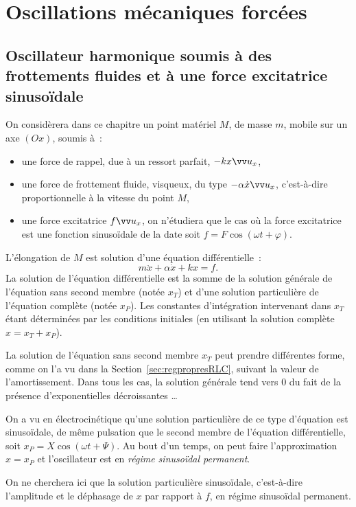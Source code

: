 \chapter{Oscillations mécaniques forcées}%
\minitoc{}
\minilof{}
\minilot{}

\section{Oscillateur harmonique soumis à des frottements fluides et à une force
excitatrice sinusoïdale}
On considèrera dans ce chapitre un point matériel \(M\), de masse \(m\), mobile
sur un axe \((Ox)\), soumis à~:
\begin{itemize}%
  \item une force de rappel, due à un ressort parfait, \(-kx \ux\),
  \item une force de frottement fluide, visqueux, du type \(-\alpha \dot{x}
    \ux\), c'est-à-dire proportionnelle à la vitesse du point \(M\),
  \item une force excitatrice \(f \ux\), on n'étudiera que le cas où la force
    excitatrice est une fonction sinusoïdale de la date soit \(f = F\cos(\omega
    t + \varphi)\).
\end{itemize}%
L'élongation de \(M\) est solution d'une équation différentielle~:
\begin{equation}%
  m\ddot{x}+\alpha\dot{x}+kx = f.
\end{equation}%
La solution de l'équation différentielle est la somme de la solution générale 
de
l'équation sans second membre (notée \(x_T\)) et d'une solution particulière de
l'équation complète (notée \(x_P\)). Les constantes d'intégration intervenant
dans \(x_T\) étant déterminées par les conditions initiales (en utilisant la
solution complète \(x = x_T+x_P\)).

La solution de l'équation sans second membre \(x_T\) peut prendre différentes
forme, comme on l'a vu dans la Section~\ref{sec:regpropresRLC}, suivant la 
valeur
de l'amortissement. Dans tous les cas, la solution générale tend vers 0 du fait
de la présence d'exponentielles décroissantes \ldots

On a vu en électrocinétique qu'une solution particulière de ce type d'équation
est sinusoïdale, de même pulsation que le second membre de l'équation
différentielle, soit \(x_P = X\cos(\omega t + \Psi)\). Au bout d'un temps, on
peut faire l'approximation \(x = x_P\) et l'oscillateur est en \emph{régime
sinusoïdal permanent}.

On ne cherchera ici que la solution particulière sinusoïdale, c'est-à-dire
l'amplitude et le déphasage de \(x\) par rapport à \(f\), en régime sinusoïdal
permanent.

